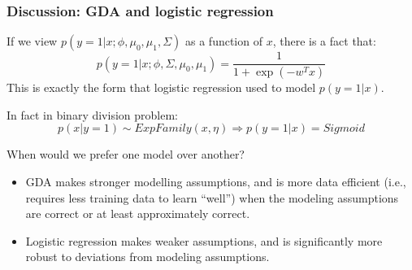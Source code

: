 \documentclass[slidestop,compress,mathserif]{beamer}
\begin{document}
    \begin{frame}[shrink]
        \frametitle{Discussion: GDA and logistic regression}
        If we view $p(y=1|x;\phi,\mu_0,\mu_1,\Sigma)$ as a function of $x$, there is a fact that:
        $$p(y=1|x;\phi,\Sigma,\mu_0,\mu_1)=\frac{1}{1+\exp(-w^Tx)}$$
        This is exactly the form that logistic regression used to model $p(y=1|x)$.

        In fact in binary division problem:
            $$p(x|y=1)\sim ExpFamily(x,\eta)\Rightarrow p(y=1|x)=Sigmoid $$

        When would we prefer one model over another?

        \begin{itemize}
          \item GDA makes stronger modelling assumptions, and is more data efficient (i.e., requires less training data to learn “well”) when the modeling assumptions are correct or at least approximately correct.
          \item Logistic regression makes weaker assumptions, and is significantly more robust to deviations from modeling assumptions.
        \end{itemize}

    \end{frame}
\end{document}

